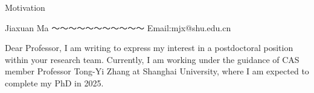 \documentclass[preprint,review,12pt,authoryear]{elsarticle}
\begin{document}
\begin{center}
\Large 
Motivation
\end{center}

\begin{center}
    Jiaxuan Ma ～～～～～～～～～～～ Email:mjx@shu.edu.cn
\end{center}

Dear Professor,
I am writing to express my interest in a postdoctoral position within your research
team.
Currently, I am working under the guidance of CAS member Professor Tong-Yi
Zhang at Shanghai University, where I am expected to complete my PhD in 2025.



%  
% 





\end{document}
